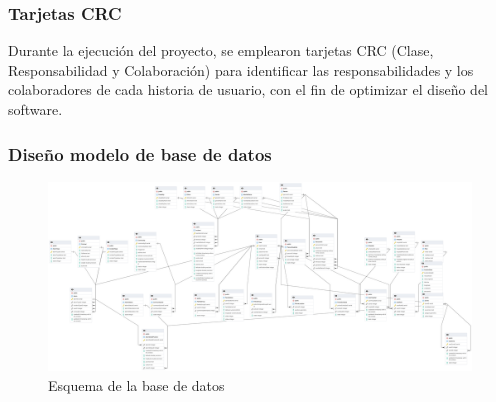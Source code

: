 \subsubsection{Tarjetas CRC}

Durante la ejecución del proyecto, se emplearon tarjetas CRC (Clase, Responsabilidad y Colaboración) para
identificar las responsabilidades y los colaboradores de cada historia de usuario, con el fin de optimizar
el diseño del software.
\bigbreak



\begin{landscape}
      \subsubsection{Diseño modelo de base de datos}
      \begin{figure}[H]
            \centering
            \includegraphics[width=1.7\textwidth]{chapters/III-resultados-y-discusion/resources/images/migracion-base-datos.png}
            \caption{Esquema de la base de datos}
            \label{fig:migracion-base-datos}
      \end{figure}
\end{landscape}



